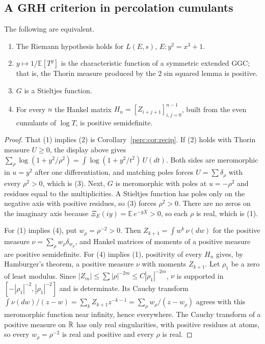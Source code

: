 \subsection{A GRH criterion in percolation cumulants}

\begin{theorem}\label{perc:thm:crit}
The following are equivalent.
\begin{enumerate}
\item The Riemann hypothesis holds for $L(E,s)$, $E: y^2 = x^3+1$.
\item $y\mapsto1/\mathbb{E}[T^y]$ is the characteristic function of a symmetric extended GGC; that is, the Thorin measure produced by the 2 sin squared lemma is positive.
\item $G$ is a Stieltjes function.
\item For every $n$ the Hankel matrix $H_n = [Z_{i+j+1}]_{i,j=0}^{n-1}$, built from the even cumulants of $\log T$, is positive semidefinite.
\end{enumerate}
\end{theorem}
\begin{proof}
That (1) implies (2) is Corollary~\ref{perc:cor:recip}. If (2) holds with Thorin measure $U\ge0$, the display above gives $\sum_\rho\log(1+y^2/\rho^2) = \int\log(1+y^2/t^2)\,U(dt)$. Both sides are meromorphic in $u = y^2$ after one differentiation, and matching poles forces $U = \sum\delta_\rho$ with every $\rho^2>0$, which is (3). Next, $G$ is meromorphic with poles at $u = -\rho^2$ and residues equal to the multiplicities. A Stieltjes function has poles only on the negative axis with positive residues, so (3) forces $\rho^2>0$. There are no zeros on the imaginary axis because $\Xi_E(iy) = \mathbb{E}\,e^{-yX}>0$, so each $\rho$ is real, which is (1).

For (1) implies (4), put $w_\rho = \rho^{-2}>0$. Then $Z_{k+1} = \int w^k\,\nu(dw)$ for the positive measure $\nu = \sum_\rho w_\rho\delta_{w_\rho}$, and Hankel matrices of moments of a positive measure are positive semidefinite. For (4) implies (1), positivity of every $H_n$ gives, by Hamburger's theorem, a positive measure $\nu$ with moments $Z_{k+1}$. Let $\rho_1$ be a zero of least modulus. Since $|Z_m|\le\sum|\rho|^{-2m}\le C|\rho_1|^{-2m}$, $\nu$ is supported in $[-|\rho_1|^{-2},|\rho_1|^{-2}]$ and is determinate. Its Cauchy transform $\int\nu(dw)/(z-w) = \sum_kZ_{k+1}z^{-k-1} = \sum_\rho w_\rho/(z-w_\rho)$ agrees with this meromorphic function near infinity, hence everywhere. The Cauchy transform of a positive measure on $\mathbb{R}$ has only real singularities, with positive residues at atoms, so every $w_\rho = \rho^{-2}$ is real and positive and every $\rho$ is real.
\end{proof}

